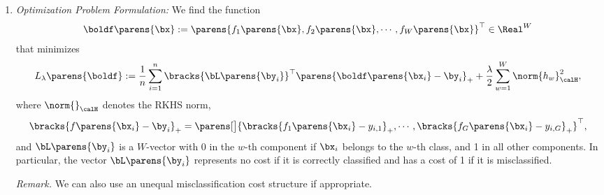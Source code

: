 \documentclass[12pt]{article}
\begin{document}
\begin{enumerate}[label=\textbf{\arabic*.}]
\begin{enumerate}
		\item \textit{Optimization Problem Formulation:} We find the function 
		\begin{align*}
			\boldf \parens{\bx} := \parens{f_1 \parens{\bx}, f_2 \parens{\bx}, \cdots, f_W \parens{\bx}}^\top \in \Real^W
		\end{align*}
		that minimizes 
		\begin{align}\label{eq-multiclass-svm-opt}
			L_{\lambda} \parens{\boldf} := \frac{1}{n} \sum_{i=1}^n \bracks{\bL \parens{\by_i}}^\top \parens{\boldf \parens{\bx_i} - \by_i}_+ + \frac{\lambda}{2} \sum_{w=1}^W \norm{h_w}_{\calH}^2, 
		\end{align}
		where $\norm{}_{\calH}$ denotes the RKHS norm, 
		\begin{align*}
			\bracks{ f \parens{\bx_i} - \by_i }_+ = \parens[\big]{ \bracks{f_1 \parens{\bx_i} - y_{i, 1}}_+, \cdots, \bracks{f_G \parens{\bx_i} - y_{i, G}}_+}^\top, 
		\end{align*}
		and 
		$\bL \parens{\by_i}$ is a $W$-vector with 0 in the $w$-th component if $\bx_i$ belongs to the $w$-th class, and 1 in all other components. In particular, the vector $\bL \parens{\by_i}$ represents no cost if it is correctly classified and has a cost of 1 if it is misclassified. 
		
		\textit{Remark.} We can also use an unequal misclassification cost structure if appropriate. 
		

\end{enumerate}
\end{enumerate}
\end{document}
